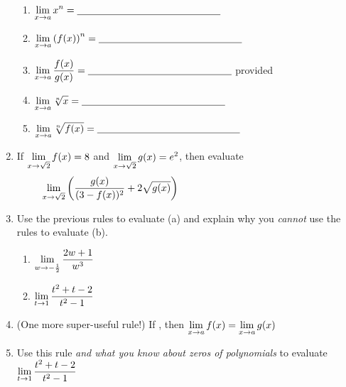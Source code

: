 \documentclass[11pt,fleqn]{article}
\begin{document}
\begin{enumerate}
\begin{enumerate}
	  \item $\displaystyle \lim_{x \to a}x^n= \underline{\hspace{2in}}$ \\ \vfill
	  
	  \item $\displaystyle \lim_{x \to a} \left(f(x)\right)^n= \underline{\hspace{2in}}$ \\ \vfill
	  
	  \item $\displaystyle \lim_{x \to a} \frac{f(x)}{g(x)}= \underline{\hspace{2in}}$  provided \underline{\hspace{2in}} \\ \vfill
	  
	  \item $\displaystyle \lim_{x \to a} \sqrt[n]{x}= \underline{\hspace{2in}}$ \\ \vfill
	  
	  \item $\displaystyle \lim_{x \to a} \sqrt[n]{f(x)}= \underline{\hspace{2in}}$ \\ \vfill

	\end{enumerate}
\newpage

\item If $\displaystyle \lim_{x \to \sqrt{2}} f(x) = 8 $ and $\displaystyle \lim_{x \to \sqrt{2}} g(x) = e^2$, then evaluate $$\displaystyle \lim_{x \to \sqrt{2}} \left(\frac{g(x)}{(3-f(x))^2}+2\sqrt{g(x)}\right) \hspace{2in} \quad$$

\vfill

\item Use the previous rules to evaluate (a) and explain why you \emph{cannot} use the rules to evaluate (b).\\
	\begin{enumerate}
	\item $\displaystyle \lim_{w \to -\frac{1}{2}} \frac{2w+1}{w^3}$
	\vfill
	\item $\displaystyle \lim_{t \to 1} \frac{t^2+t-2}{t^2-1}$
	\vfill
	\end{enumerate}
	
\item (One more super-useful rule!) If \hspace{2in}, then $\displaystyle \lim_{x \to a} f(x) = \lim_{x \to a} g(x) $
\vfill
\item Use this rule \emph{and what you know about zeros of polynomials} to evaluate\\

\noindent $\displaystyle \lim_{t \to 1} \frac{t^2+t-2}{t^2-1}$


\end{enumerate}
\end{document}
